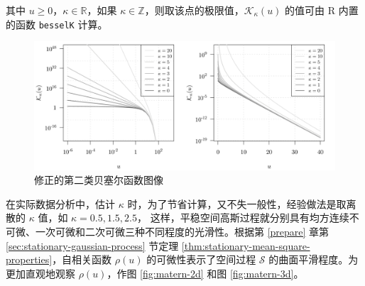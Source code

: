 \documentclass[12pt,a4paper,UTF8,twoside]{book}
\theoremstyle{definition}
\theoremstyle{definition}
\theoremstyle{definition}
\theoremstyle{remark}
\begin{document}
\noindent 其中 \(u \geq 0\)，\(\kappa \in \mathbb{R}\)，如果
\(\kappa \in \mathbb{Z}\)，则取该点的极限值，\(\mathcal{K}_{\kappa}(u)\)
的值可由 R 内置的函数 \texttt{besselK} 计算。

\begin{figure}

{\centering \includegraphics[width=0.7\linewidth]{figures/bessel} 

}

\caption{修正的第二类贝塞尔函数图像}\label{fig:bessel-function}
\end{figure}



在实际数据分析中，估计 \(\kappa\)
时，为了节省计算，又不失一般性，经验做法是取离散的 \(\kappa\) 值，如
\(\kappa = 0.5, 1.5, 2.5\)，
这样，平稳空间高斯过程就分别具有均方连续不可微、一次可微和二次可微三种不同程度的光滑性。根据第
\ref{prepare} 章第 \ref{sec:stationary-gaussian-process} 节定理
\ref{thm:stationary-mean-square-properties}，自相关函数 \(\rho(u)\)
的可微性表示了空间过程 \(\mathcal{S}\) 的曲面平滑程度。为更加直观地观察
\(\rho(u)\)，作图 \ref{fig:matern-2d} 和图 \ref{fig:matern-3d}。
\end{document}
